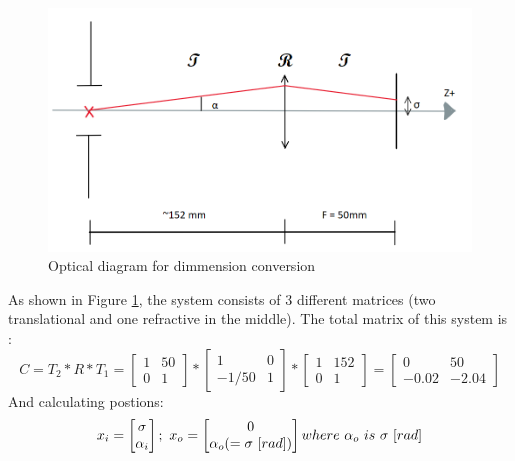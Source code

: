 \begin{figure}[H]
    \centering
    \includegraphics[scale=0.85]{assets/figures/Software/OpticMatrice.png}
    \caption{Optical diagram for dimmension conversion}
    \label{fig:Soft_OptiMat}
\end{figure}
As shown in Figure \ref{fig:Soft_OptiMat}, the system consists of 3 different matrices (two translational and one refractive in the middle).
The total matrix of this system is :
\begin{equation}
    C = T_2 * R * T_1 =
    \begin{bmatrix}
        1 & 50 \\
        0 & 1
    \end{bmatrix}
    *
    \begin{bmatrix}
        1     & 0 \\
        -1/50 & 1
    \end{bmatrix}
    *
    \begin{bmatrix}
        1 & 152 \\
        0 & 1
    \end{bmatrix}
    =
    \begin{bmatrix}
        0     & 50    \\
        -0.02 & -2.04
    \end{bmatrix}
\end{equation}
And calculating postions:
\begin{equation}
    x_i = \begin{bmatrix}
        \sigma \\
        \alpha_i
    \end{bmatrix}
    ; \ x_o =
    \begin{bmatrix}
        0 \\
        \alpha_o (= \sigma\ [rad])
    \end{bmatrix}
    \\ where\ \alpha_o\ is\ \sigma\ [rad]
\end{equation}
